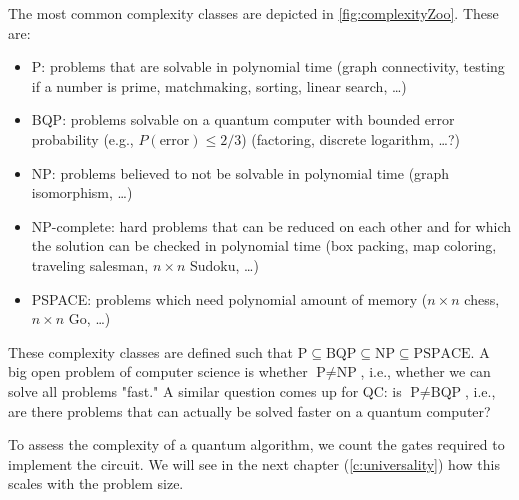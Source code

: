	The most common complexity classes are depicted in \autoref{fig:complexityZoo}. These are:
	\begin{itemize}
		\item P: problems that are solvable in polynomial time (graph connectivity, testing if a number is prime, matchmaking, sorting, linear search, \dots)
		\item \ac{BQP}: problems solvable on a quantum computer with bounded error probability (e.g., \( P(\text{error}) \leq 2/3 \)) (factoring, discrete logarithm, \dots?)
		\item NP: problems believed to not be solvable in polynomial time (graph isomorphism, \dots)
		\item NP-complete: hard problems that can be reduced on each other and for which the solution can be checked in polynomial time (box packing, map coloring, traveling salesman, \(n \times n\) Sudoku, \dots)
		\item PSPACE: problems which need polynomial amount of memory (\(n \times n\) chess, \(n \times n\) Go, \dots)
	\end{itemize}
	These complexity classes are defined such that \(\text{P} \subseteq \text{BQP} \subseteq \text{NP} \subseteq \text{PSPACE}\). A big open problem of computer science is whether \( \text{P} \neq \text{NP} \), i.e., whether we can solve all problems "fast." A similar question comes up for \ac{QC}: is \( \text{P} \neq \text{BQP} \), i.e., are there problems that can actually be solved faster on a quantum computer?

	To assess the complexity of a quantum algorithm, we count the gates required to implement the circuit. We will see in the next chapter (\autoref{c:universality}) how this scales with the problem size.


